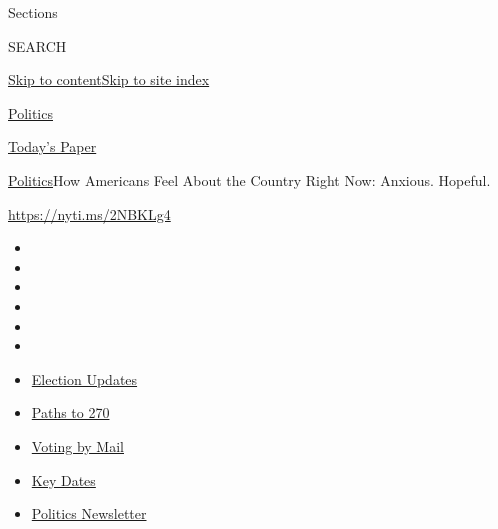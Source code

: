 Sections

SEARCH

\protect\hyperlink{site-content}{Skip to
content}\protect\hyperlink{site-index}{Skip to site index}

\href{https://www.nytimes3xbfgragh.onion/section/politics}{Politics}

\href{https://myaccount.nytimes3xbfgragh.onion/auth/login?response_type=cookie\&client_id=vi}{}

\href{https://www.nytimes3xbfgragh.onion/section/todayspaper}{Today's
Paper}

\href{/section/politics}{Politics}\textbar{}How Americans Feel About the
Country Right Now: Anxious. Hopeful.

\url{https://nyti.ms/2NBKLg4}

\begin{itemize}
\item
\item
\item
\item
\item
\item
\end{itemize}

\begin{itemize}
\item
  \href{https://www.nytimes3xbfgragh.onion/live/2020/09/07/us/trump-vs-biden?action=click\&pgtype=Article\&state=default\&region=TOP_BANNER\&context=storylines_menu}{Election
  Updates}
\item
  \href{https://www.nytimes3xbfgragh.onion/interactive/2020/us/elections/election-states-biden-trump.html?action=click\&pgtype=Article\&state=default\&region=TOP_BANNER\&context=storylines_menu}{Paths
  to 270}
\item
  \href{https://www.nytimes3xbfgragh.onion/interactive/2020/08/31/us/politics/vote-by-mail-deadlines.html?action=click\&pgtype=Article\&state=default\&region=TOP_BANNER\&context=storylines_menu}{Voting
  by Mail}
\item
  \href{https://www.nytimes3xbfgragh.onion/interactive/2019/us/elections/2020-presidential-election-calendar.html?action=click\&pgtype=Article\&state=default\&region=TOP_BANNER\&context=storylines_menu}{Key
  Dates}
\item
  \href{https://www.nytimes3xbfgragh.onion/newsletters/politics?action=click\&pgtype=Article\&state=default\&region=TOP_BANNER\&context=storylines_menu}{Politics
  Newsletter}
\end{itemize}

